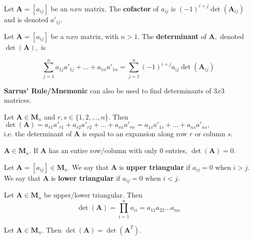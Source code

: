\documentclass{article}
\begin{document}
\begin{definition}
Let $\boldsymbol{A} = [a_{ij}]$ be an $nxn$ matrix. The \textbf{cofactor} of $a_{ij}$ is $(-1)^{i+j}\det(\boldsymbol{A}_{ij})$ and is denoted $a'_{ij}.$
\end{definition}

\begin{definition}
Let $\boldsymbol{A} = [a_{ij}]$ be a $nxn$ matrix, with $n > 1.$ The \textbf{determinant} of $\boldsymbol{A},$ denoted $\det(\boldsymbol{A}),$ is

\[ \sum_{j=1}^{n} a_{1j}a'_{1j} + ... + a_{1n}a'_{1n} = \sum_{j=1}^{n} (-1)^{i+j}a_{ij}\det(\boldsymbol{A}_{ij}) \]

\textbf{Sarrus' Rule/Mnemonic} can also be used to find determinants of $3 x 3$ matrices.
\end{definition}

\begin{theorem}
Let $\boldsymbol{A} \in \boldsymbol{M}_n$ and $r, s \in \{1, 2, ... , n\}.$ Then $\det(\boldsymbol{A}) = a_{r1}a'_{r1} + a_{r2}a'_{r2} + ... + a_{rn}a'_{rn} = a_{1s}a'_{1s} + ... + a_{ns}a'_{ns},$ \\ i.e. the determinant of $\boldsymbol{A}$ is equal to an expansion along row $r$ or column $s$.
\end{theorem}

\begin{corollary}
$\boldsymbol{A} \in \boldsymbol{M}_n.$ If $\boldsymbol{A}$ has an entire row/column with only $0$ entries, $\det(\boldsymbol{A}) = 0.$
\end{corollary}

\begin{definition}
Let $\boldsymbol{A} = [a_{ij}] \in \boldsymbol{M}_n.$ We say that $\boldsymbol{A}$ is \textbf{upper triangular} if $a_{ij} = 0$ when $i > j.$ We say that $\boldsymbol{A}$ is \textbf{lower triangular} if $a_{ij} = 0$ when $i < j.$ 
\end{definition}

\begin{theorem}
Let $\boldsymbol{A} \in \boldsymbol{M}_n$ be upper/lower triangular. Then 
\[\det(\boldsymbol{A}) = \prod_{i=1}^{n} a_{ii} = a_{11}a_{22}...a_{nn} \]
\end{theorem}

\begin{theorem}
Let $\boldsymbol{A} \in \boldsymbol{M}_n.$ Then $\det(\boldsymbol{A}) = \det(\boldsymbol{A}^{T}).$ \\
\end{theorem}
\end{document}

